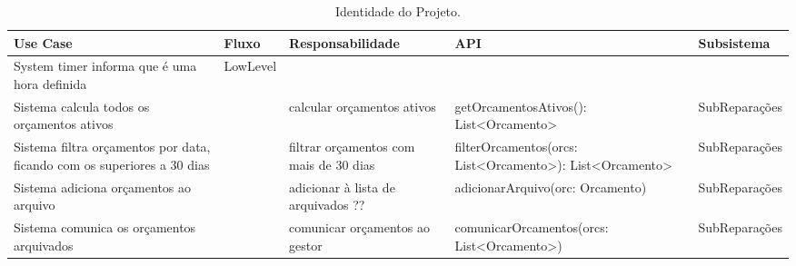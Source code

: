 \documentclass[../relatorio.tex]{subfiles}
\begin{document}
\begin{landscape}
    \begin{table}[!h]
        \centering
        \begin{tabular}{|p{5cm}|p{1cm}|p{4cm}|p{6cm}|p{3cm}|}
            \hline
            \rowcolor{gray!20!white}
            Use Case                                                                & Fluxo    & Responsabilidade                       & API                                                      & Subsistema    \\
            \hline
            \rowcolor{red}
            System timer informa que é uma hora definida                            & LowLevel &                                        &                                                          &               \\
            \hline
            Sistema calcula todos os orçamentos ativos                              &          & calcular orçamentos ativos             & getOrcamentosAtivos(): List<Orcamento>                   & SubReparações \\
            \hline
            Sistema filtra orçamentos por data, ficando com os superiores a 30 dias &          & filtrar orçamentos com mais de 30 dias & filterOrcamentos(orcs: List<Orcamento>): List<Orcamento> & SubReparações \\
            \hline
            Sistema adiciona orçamentos ao arquivo                                  &          & adicionar à lista de arquivados ??     & adicionarArquivo(orc: Orcamento)                         & SubReparações \\
            \hline
            Sistema comunica os orçamentos arquivados                               &          & comunicar orçamentos ao gestor         & comunicarOrcamentos(orcs: List<Orcamento>)               & SubReparações \\
            \hline                      
        \end{tabular}
        \caption{Identidade do Projeto.}
    \end{table}
\end{landscape}
\end{document}
